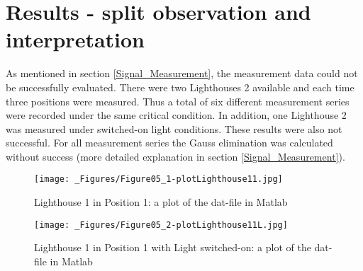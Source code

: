 \documentclass[a4paper,twoside, openright,12pt]{report}
\begin{document}
\chapter{Results - split observation and interpretation}
\label{Chapter_Results}
As mentioned in section \ref{Signal_Measurement}, the measurement data could not be successfully evaluated. There were two Lighthouses 2 available and each time three positions were measured. Thus a total of six different measurement series were recorded under the same critical condition. In addition, one Lighthouse 2 was measured under switched-on light conditions. These results were also not successful. For all measurement series the Gauss elimination was calculated without success (more detailed explanation in section \ref{Signal_Measurement}).
\begin{figure}[h]
\begin{center}
\texttt{[image: \_Figures/Figure05\_1-plotLighthouse11.jpg]}
\caption{Lighthouse 1 in Position 1: a plot of the dat-file in Matlab}
\label{plotLigthhouse11}
\end{center}
\end{figure}

\begin{figure}[h]
\begin{center}
\texttt{[image: \_Figures/Figure05\_2-plotLighthouse11L.jpg]}
\caption{Lighthouse 1 in Position 1 with Light switched-on: a plot of the dat-file in Matlab}
\label{plotLighthouse11L}
\end{center}
\end{figure}
\end{document}
